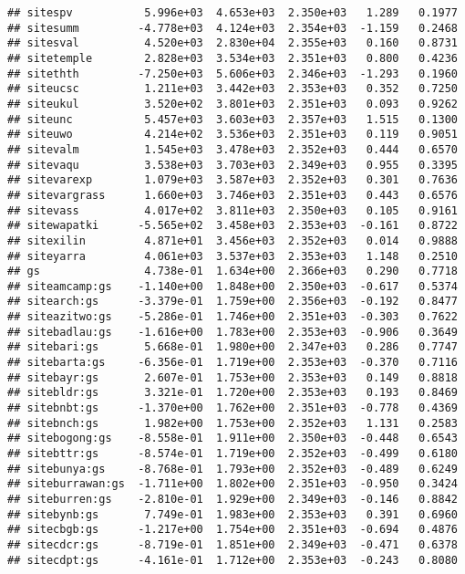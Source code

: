 \documentclass[
]{article}
\begin{document}
\begin{verbatim}
## sitespv           5.996e+03  4.653e+03  2.350e+03   1.289   0.1977  
## sitesumm         -4.778e+03  4.124e+03  2.354e+03  -1.159   0.2468  
## sitesval          4.520e+03  2.830e+04  2.355e+03   0.160   0.8731  
## sitetemple        2.828e+03  3.534e+03  2.351e+03   0.800   0.4236  
## sitethth         -7.250e+03  5.606e+03  2.346e+03  -1.293   0.1960  
## siteucsc          1.211e+03  3.442e+03  2.353e+03   0.352   0.7250  
## siteukul          3.520e+02  3.801e+03  2.351e+03   0.093   0.9262  
## siteunc           5.457e+03  3.603e+03  2.357e+03   1.515   0.1300  
## siteuwo           4.214e+02  3.536e+03  2.351e+03   0.119   0.9051  
## sitevalm          1.545e+03  3.478e+03  2.352e+03   0.444   0.6570  
## sitevaqu          3.538e+03  3.703e+03  2.349e+03   0.955   0.3395  
## sitevarexp        1.079e+03  3.587e+03  2.352e+03   0.301   0.7636  
## sitevargrass      1.660e+03  3.746e+03  2.351e+03   0.443   0.6576  
## sitevass          4.017e+02  3.811e+03  2.350e+03   0.105   0.9161  
## sitewapatki      -5.565e+02  3.458e+03  2.353e+03  -0.161   0.8722  
## sitexilin         4.871e+01  3.456e+03  2.352e+03   0.014   0.9888  
## siteyarra         4.061e+03  3.537e+03  2.353e+03   1.148   0.2510  
## gs                4.738e-01  1.634e+00  2.366e+03   0.290   0.7718  
## siteamcamp:gs    -1.140e+00  1.848e+00  2.350e+03  -0.617   0.5374  
## sitearch:gs      -3.379e-01  1.759e+00  2.356e+03  -0.192   0.8477  
## siteazitwo:gs    -5.286e-01  1.746e+00  2.351e+03  -0.303   0.7622  
## sitebadlau:gs    -1.616e+00  1.783e+00  2.353e+03  -0.906   0.3649  
## sitebari:gs       5.668e-01  1.980e+00  2.347e+03   0.286   0.7747  
## sitebarta:gs     -6.356e-01  1.719e+00  2.353e+03  -0.370   0.7116  
## sitebayr:gs       2.607e-01  1.753e+00  2.353e+03   0.149   0.8818  
## sitebldr:gs       3.321e-01  1.720e+00  2.353e+03   0.193   0.8469  
## sitebnbt:gs      -1.370e+00  1.762e+00  2.351e+03  -0.778   0.4369  
## sitebnch:gs       1.982e+00  1.753e+00  2.352e+03   1.131   0.2583  
## sitebogong:gs    -8.558e-01  1.911e+00  2.350e+03  -0.448   0.6543  
## sitebttr:gs      -8.574e-01  1.719e+00  2.352e+03  -0.499   0.6180  
## sitebunya:gs     -8.768e-01  1.793e+00  2.352e+03  -0.489   0.6249  
## siteburrawan:gs  -1.711e+00  1.802e+00  2.351e+03  -0.950   0.3424  
## siteburren:gs    -2.810e-01  1.929e+00  2.349e+03  -0.146   0.8842  
## sitebynb:gs       7.749e-01  1.983e+00  2.353e+03   0.391   0.6960  
## sitecbgb:gs      -1.217e+00  1.754e+00  2.351e+03  -0.694   0.4876  
## sitecdcr:gs      -8.719e-01  1.851e+00  2.349e+03  -0.471   0.6378  
## sitecdpt:gs      -4.161e-01  1.712e+00  2.353e+03  -0.243   0.8080  

\end{verbatim}
\end{document}
